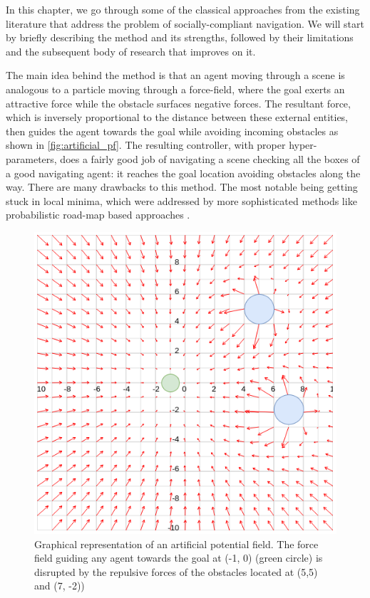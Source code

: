In this chapter, we go through some of the classical approaches from the existing literature that address the problem of socially-compliant navigation. We will start by briefly describing the method and its strengths, followed by their limitations and the subsequent body of research that improves on it.
\par
{} The main idea behind the method is that an agent moving through a scene is analogous to a particle moving through a force-field, where the goal exerts an attractive force while the obstacle surfaces negative forces. The resultant force, which is inversely proportional to the distance between these external entities, then guides the agent towards the goal while avoiding incoming obstacles as shown in \autoref{fig:artificial_pf}. The resulting controller, with proper hyper-parameters, does a fairly good job of navigating a scene checking all the boxes of a good navigating agent: it reaches the goal location avoiding obstacles along the way. There are many drawbacks to this method. The most notable being getting stuck in local minima, which were addressed by more sophisticated methods like probabilistic road-map based approaches \cite{Lavalle98rrt}. \\
\begin{figure}
	\centering
	\includegraphics[width=.6\linewidth]{figures/vector_field_pf.png}
	\caption{Graphical representation of an artificial potential field. The force field guiding any agent  towards the goal at (-1, 0) (green circle) is disrupted by the repulsive forces of the obstacles located at (5,5) and (7, -2))}
	\label{fig:artificial_pf}
\end{figure}
